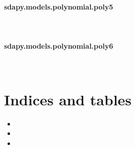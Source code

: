 \documentclass[letterpaper,10pt,english]{sphinxmanual}
\begin{document}
\begin{fulllineitems}
\label{\detokenize{generated/sdapy.models.polynomial.poly4:sdapy.models.polynomial.poly4}}~
\end{fulllineitems}



\subsubsection{sdapy.models.polynomial.poly5}
\label{\detokenize{generated/sdapy.models.polynomial.poly5:sdapy-models-polynomial-poly5}}\label{\detokenize{generated/sdapy.models.polynomial.poly5::doc}}

\begin{fulllineitems}
\label{\detokenize{generated/sdapy.models.polynomial.poly5:sdapy.models.polynomial.poly5}}~
\end{fulllineitems}



\subsubsection{sdapy.models.polynomial.poly6}
\label{\detokenize{generated/sdapy.models.polynomial.poly6:sdapy-models-polynomial-poly6}}\label{\detokenize{generated/sdapy.models.polynomial.poly6::doc}}

\begin{fulllineitems}
\label{\detokenize{generated/sdapy.models.polynomial.poly6:sdapy.models.polynomial.poly6}}~
\end{fulllineitems}



\chapter{Indices and tables}
\label{\detokenize{index:indices-and-tables}}\begin{itemize}
\item {} 

\item {} 

\item {} 

\end{itemize}
\end{document}
